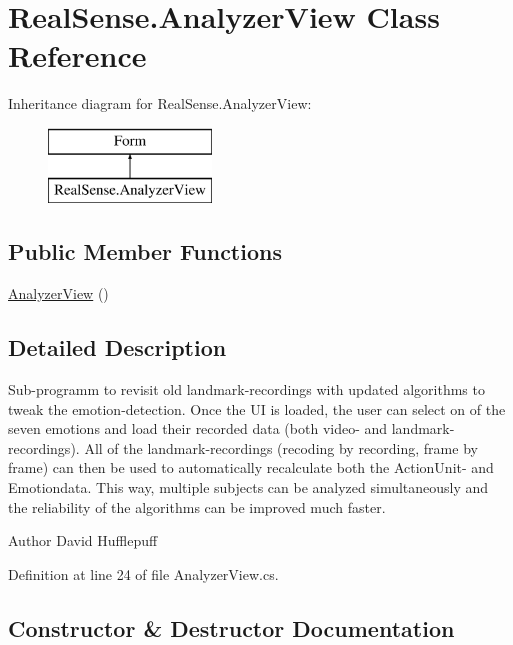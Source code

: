 \hypertarget{class_real_sense_1_1_analyzer_view}{}\section{Real\+Sense.\+Analyzer\+View Class Reference}
\label{class_real_sense_1_1_analyzer_view}
Inheritance diagram for Real\+Sense.\+Analyzer\+View\+:\begin{figure}[H]
\begin{center}
\leavevmode
\includegraphics[height=2.000000cm]{class_real_sense_1_1_analyzer_view}
\end{center}
\end{figure}
\subsection*{Public Member Functions}
\begin{DoxyCompactItemize}
\item 
\hyperlink{class_real_sense_1_1_analyzer_view_ae982969308d52738e20d686cd24b88e8}{Analyzer\+View} ()
\end{DoxyCompactItemize}


\subsection{Detailed Description}
Sub-\/programm to revisit old landmark-\/recordings with updated algorithms to tweak the emotion-\/detection. Once the UI is loaded, the user can select on of the seven emotions and load their recorded data (both video-\/ and landmark-\/recordings). All of the landmark-\/recordings (recoding by recording, frame by frame) can then be used to automatically recalculate both the Action\+Unit-\/ and Emotiondata. This way, multiple subjects can be analyzed simultaneously and the reliability of the algorithms can be improved much faster. \begin{DoxyAuthor}{Author}
David  Hufflepuff 
\end{DoxyAuthor}


Definition at line 24 of file Analyzer\+View.\+cs.



\subsection{Constructor \& Destructor Documentation}
\mbox{\label{class_real_sense_1_1_analyzer_view_ae982969308d52738e20d686cd24b88e8}} 
